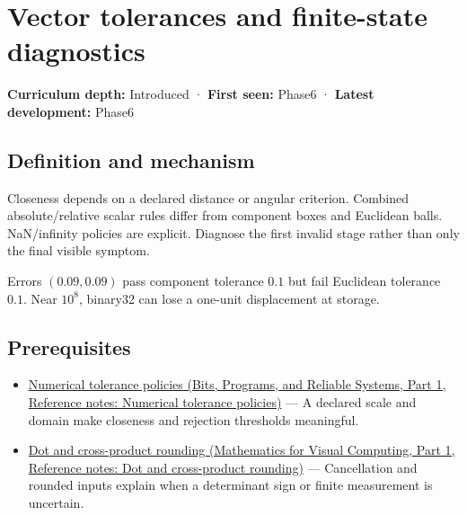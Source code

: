 \hypertarget{appendix-b5b83329215b}{}\label{referencestart:appendix-b5b83329215b}
\section{Vector tolerances and finite-state diagnostics}\label{appendix-b5b83329215b-vector-tolerances-and-finite-state-diagnostics}

\hypertarget{appendix-b5b83329215b-vector-tolerances-and-finite-state-diagnostics}{}

\textbf{Curriculum depth:} Introduced · \textbf{First seen:} Phase6 · \textbf{Latest development:} Phase6

\begin{allmightroledefinition}

\subsection{Definition and mechanism}\label{appendix-b5b83329215b-definition-and-mechanism}

\hypertarget{appendix-b5b83329215b-definition-and-mechanism}{}

Closeness depends on a declared distance or angular criterion. Combined absolute/relative scalar rules differ from component boxes and Euclidean balls. NaN/infinity policies are explicit. Diagnose the first invalid stage rather than only the final visible symptom.

\end{allmightroledefinition}

Errors \((0.09,0.09)\) pass component tolerance \(0.1\) but fail Euclidean tolerance \(0.1\). Near \(10^8\), binary32 can lose a one-unit displacement at storage.

\subsection{Prerequisites}\label{appendix-b5b83329215b-prerequisites}

\hypertarget{appendix-b5b83329215b-prerequisites}{}

\begin{itemize}
\tightlist
\item
  \href{../01-Bits-Programs-and-Reliable-Systems-P01/main.pdf\#nameddest=appendix-0ec599f8ba27}{Numerical tolerance policies (Bits, Programs, and Reliable Systems, Part 1, Reference notes: Numerical tolerance policies)} --- A declared scale and domain make closeness and rejection thresholds meaningful.
\item
  \href{../02-Mathematics-for-Visual-Computing-P01/main.pdf\#nameddest=appendix-5aef4f13483a}{Dot and cross-product rounding (Mathematics for Visual Computing, Part 1, Reference notes: Dot and cross-product rounding)} --- Cancellation and rounded inputs explain when a determinant sign or finite measurement is uncertain.
\end{itemize}

